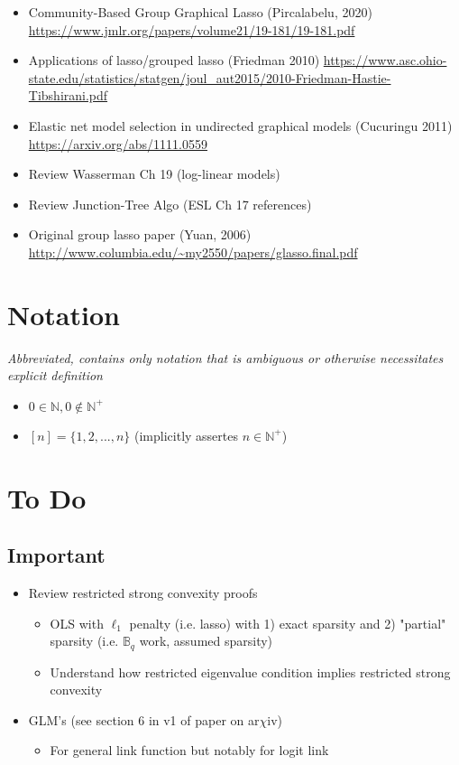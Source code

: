\documentclass[11pt]{article}
\begin{document}
\begin{itemize}
    \item Community-Based Group Graphical Lasso (Pircalabelu, 2020) \url{https://www.jmlr.org/papers/volume21/19-181/19-181.pdf}
    \item Applications of lasso/grouped lasso (Friedman 2010) \url{https://www.asc.ohio-state.edu/statistics/statgen/joul_aut2015/2010-Friedman-Hastie-Tibshirani.pdf}
    \item Elastic net model selection in undirected graphical models (Cucuringu 2011) \url{https://arxiv.org/abs/1111.0559}
    \item Review Wasserman Ch 19 (log-linear models)
    \item Review Junction-Tree Algo (ESL Ch 17 references) 
    \item Original group lasso paper (Yuan, 2006) \url{http://www.columbia.edu/~my2550/papers/glasso.final.pdf}
\end{itemize}


\newpage 

\section*{Notation}

{\it Abbreviated, contains only notation that is ambiguous or otherwise necessitates explicit definition}

\begin{itemize}
    \item $0 \in \mathbb{N}, 0 \not\in \mathbb{N}^+$
    \item $[n] = \{1, 2, ..., n\}$ (implicitly assertes $n \in \mathbb{N}^+$)
\end{itemize}

\newpage  
\section*{To Do}

\subsection*{Important}

\begin{itemize}
    \item Review restricted strong convexity proofs 
    \begin{itemize}
        \item OLS with $\ell_1$ penalty (i.e. lasso) with 1) exact sparsity and 2) "partial" sparsity (i.e. $\mathbb{B}_q$ work, assumed sparsity)
        \item Understand how restricted eigenvalue condition implies restricted strong convexity 
    \end{itemize}
    \item GLM's (see section 6 in v1 of paper on ar$\chi$iv)
    \begin{itemize}
        \item For general link function but notably for logit link
    \end{itemize}
\end{itemize}
\end{document}
